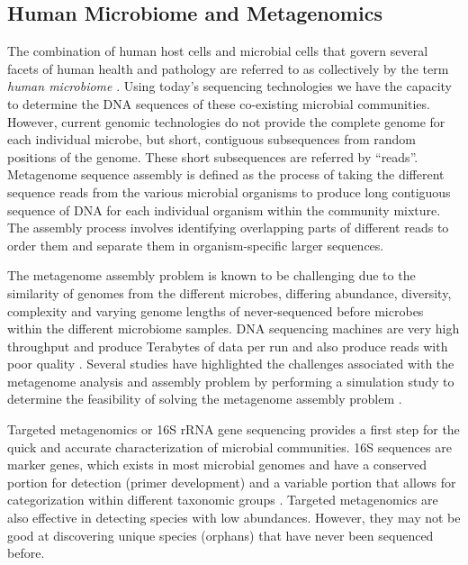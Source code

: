 
\subsection{Human Microbiome and Metagenomics}

The combination of human host cells and microbial 
cells that govern several facets of human health and pathology are referred 
to as collectively by the term \emph{human microbiome} \cite{hugenholtz2008microbiology}. 
%
Using today's sequencing technologies we have the capacity to determine 
the DNA sequences of these co-existing microbial communities. 
However, 
current  genomic  technologies 
do not provide the complete genome for each individual microbe, but 
  short, contiguous subsequences from random positions of the genome. These 
  short subsequences are referred by ``reads''. 
%
Metagenome sequence assembly is defined as the process of taking the different 
sequence reads from the various microbial organisms to produce long contiguous 
sequence of DNA for each individual organism within the community mixture. 
%
The assembly process involves identifying overlapping parts of different reads 
to order them and separate them in organism-specific larger sequences.
%


The metagenome assembly problem is known to be challenging due 
  to the similarity of genomes from the different microbes, 
differing 
  abundance, diversity, complexity and varying
  genome lengths of never-sequenced before microbes within 
  the different microbiome samples. DNA sequencing machines  
  are very high throughput and produce Terabytes of data per run and 
  also produce reads with poor quality  \cite{hugenholtz2008microbiology}. Several studies 
  have highlighted the challenges associated with the metagenome analysis and assembly problem by performing a simulation study to determine the feasibility of solving the metagenome assembly problem \cite{charuvaka2011evaluation}.

  Targeted metagenomics or 16S rRNA gene sequencing provides
  a
  first step for the quick and accurate characterization of
  microbial communities. 16S sequences are marker genes, which
  exists in most microbial genomes and
  have a conserved portion
  for detection (primer development) and a variable portion that allows for
    categorization within  different  taxonomic groups \cite{petrosino2009metagenomic}.
        Targeted metagenomics are also effective in detecting species with low 
        abundances. However, they may not be good at discovering 
        unique species (orphans) that have never been sequenced before. %


